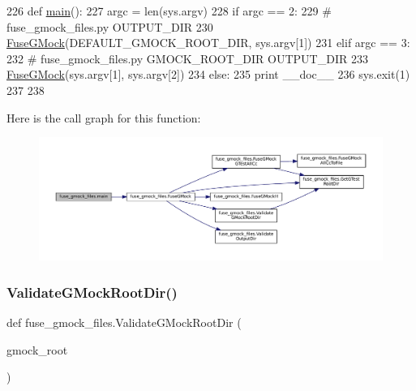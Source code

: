 \begin{DoxyCode}
226 \textcolor{keyword}{def }\hyperlink{namespacefuse__gmock__files_a64e8cd1ead5a1454265cbc2d3db4d425}{main}():
227   argc = len(sys.argv)
228   \textcolor{keywordflow}{if} argc == 2:
229     \textcolor{comment}{# fuse\_gmock\_files.py OUTPUT\_DIR}
230     \hyperlink{namespacefuse__gmock__files_ae76b6bc18373325fc3f002abf5c4378f}{FuseGMock}(DEFAULT\_GMOCK\_ROOT\_DIR, sys.argv[1])
231   \textcolor{keywordflow}{elif} argc == 3:
232     \textcolor{comment}{# fuse\_gmock\_files.py GMOCK\_ROOT\_DIR OUTPUT\_DIR}
233     \hyperlink{namespacefuse__gmock__files_ae76b6bc18373325fc3f002abf5c4378f}{FuseGMock}(sys.argv[1], sys.argv[2])
234   \textcolor{keywordflow}{else}:
235     \textcolor{keywordflow}{print} \_\_doc\_\_
236     sys.exit(1)
237 
238 
\end{DoxyCode}
Here is the call graph for this function\+:
\nopagebreak
\begin{figure}[H]
\begin{center}
\leavevmode
\includegraphics[width=350pt]{namespacefuse__gmock__files_a64e8cd1ead5a1454265cbc2d3db4d425_cgraph}
\end{center}
\end{figure}
\mbox{\label{namespacefuse__gmock__files_aaec09f55a62b3d65b5d25fe0050e9e05}} 
\subsubsection{\texorpdfstring{Validate\+G\+Mock\+Root\+Dir()}{ValidateGMockRootDir()}}
{\footnotesize\ttfamily def fuse\+\_\+gmock\+\_\+files.\+Validate\+G\+Mock\+Root\+Dir (\begin{DoxyParamCaption}\item[{}]{gmock\+\_\+root }\end{DoxyParamCaption})}


